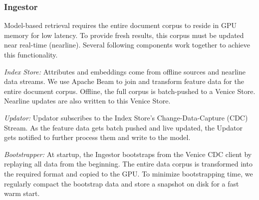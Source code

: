 \subsubsection{Ingestor}
Model-based retrieval requires the entire document corpus to reside in GPU memory for low latency. To provide fresh results, this corpus must be updated near real-time (nearline). Several following components work together to achieve this functionality.

\textit{Index Store:}
Attributes and embeddings come from offline sources and nearline data streams. We use Apache Beam to join and transform feature data for the entire document corpus. Offline, the full corpus is batch-pushed to a Venice Store. Nearline updates are also written to this Venice Store.

\textit{Updator:}
Updator subscribes to the Index Store's Change-Data-Capture (CDC) Stream. As the feature data gets batch pushed and live updated, the Updator gets notified to further process them and write to the model.

\textit{Bootstrapper:}
At startup, the Ingestor bootstraps from the Venice CDC client by replaying all data from the beginning. The entire data corpus is transformed into the required format and copied to the GPU. To minimize bootstrapping time, we regularly compact the bootstrap data and store a snapshot on disk for a fast warm start.
